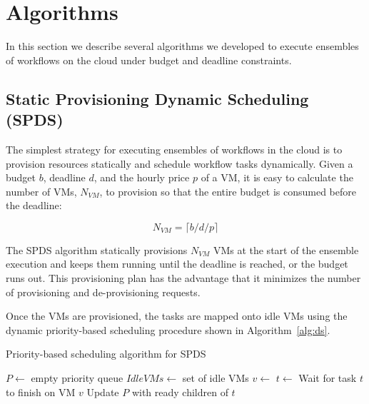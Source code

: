 \documentclass{sig-alternate}
\begin{document}
\section{Algorithms}
\label{sec:algorithms}

In this section we describe several algorithms we developed to execute ensembles of
workflows on the cloud under budget and deadline constraints.

\subsection{Static Provisioning Dynamic Scheduling \\
(SPDS) }
\label{sec:spds}

The simplest strategy for executing ensembles of workflows in the cloud is to
provision resources statically and schedule workflow tasks dynamically. Given a 
budget $b$, deadline $d$, and the hourly price $p$ of a VM, it is easy to calculate
the number of VMs, $N_{VM}$, to provision so that the entire budget is consumed before
the deadline:

\begin{equation}
\label{eq:static-plan}
N_{VM} = \lceil b / d / p \rceil
\end{equation}

The SPDS algorithm statically provisions $N_{VM}$ VMs at the start of the ensemble execution 
and keeps them running until the deadline is reached, or the budget runs out.
This provisioning plan has the advantage that it minimizes the number of provisioning 
and de-provisioning requests.

Once the VMs are provisioned, the tasks are mapped onto idle VMs using the dynamic
priority-based scheduling procedure shown in Algorithm~\ref{alg:ds}.

\begin{algorithm}
\caption{Priority-based scheduling algorithm for SPDS}
\label{alg:ds}
\begin{algorithmic}[1]
    \State $P\gets$ empty priority queue
	\State $IdleVMs\gets$ set of idle VMs
    	\State {} 
    \EndFor
    		\State $v\gets$ 
    		\State $t\gets$ 
    		\State {}
    	\EndWhile
    	\State Wait for task $t$ to finish on VM $v$
    	\State Update $P$ with ready children of $t$
		\State {}
    \EndWhile
\EndProcedure
\end{algorithmic} 
\end{algorithm}
\end{document}
